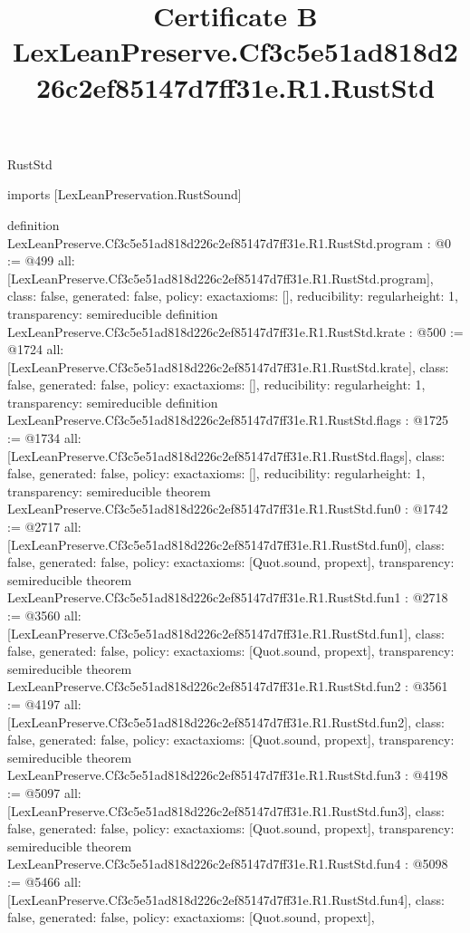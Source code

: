 \begin{lexlean}{RustStd}
\title{Certificate B LexLeanPreserve.Cf3c5e51ad818d226c2ef85147d7ff31e.R1.RustStd}
\begin{coremodule}
imports [LexLeanPreservation.RustSound]

definition LexLeanPreserve.Cf3c5e51ad818d226c2ef85147d7ff31e.R1.RustStd.program : @0 := @499 {
  all: [LexLeanPreserve.Cf3c5e51ad818d226c2ef85147d7ff31e.R1.RustStd.program],
  class: false,
  generated: false,
  policy: exact{axioms: []},
  reducibility: regular{height: 1},
  transparency: semireducible
}
definition LexLeanPreserve.Cf3c5e51ad818d226c2ef85147d7ff31e.R1.RustStd.krate : @500 := @1724 {
  all: [LexLeanPreserve.Cf3c5e51ad818d226c2ef85147d7ff31e.R1.RustStd.krate],
  class: false,
  generated: false,
  policy: exact{axioms: []},
  reducibility: regular{height: 1},
  transparency: semireducible
}
definition LexLeanPreserve.Cf3c5e51ad818d226c2ef85147d7ff31e.R1.RustStd.flags : @1725 := @1734 {
  all: [LexLeanPreserve.Cf3c5e51ad818d226c2ef85147d7ff31e.R1.RustStd.flags],
  class: false,
  generated: false,
  policy: exact{axioms: []},
  reducibility: regular{height: 1},
  transparency: semireducible
}
theorem LexLeanPreserve.Cf3c5e51ad818d226c2ef85147d7ff31e.R1.RustStd.fun0 : @1742 := @2717 {
  all: [LexLeanPreserve.Cf3c5e51ad818d226c2ef85147d7ff31e.R1.RustStd.fun0],
  class: false,
  generated: false,
  policy: exact{axioms: [Quot.sound, propext]},
  transparency: semireducible
}
theorem LexLeanPreserve.Cf3c5e51ad818d226c2ef85147d7ff31e.R1.RustStd.fun1 : @2718 := @3560 {
  all: [LexLeanPreserve.Cf3c5e51ad818d226c2ef85147d7ff31e.R1.RustStd.fun1],
  class: false,
  generated: false,
  policy: exact{axioms: [Quot.sound, propext]},
  transparency: semireducible
}
theorem LexLeanPreserve.Cf3c5e51ad818d226c2ef85147d7ff31e.R1.RustStd.fun2 : @3561 := @4197 {
  all: [LexLeanPreserve.Cf3c5e51ad818d226c2ef85147d7ff31e.R1.RustStd.fun2],
  class: false,
  generated: false,
  policy: exact{axioms: [Quot.sound, propext]},
  transparency: semireducible
}
theorem LexLeanPreserve.Cf3c5e51ad818d226c2ef85147d7ff31e.R1.RustStd.fun3 : @4198 := @5097 {
  all: [LexLeanPreserve.Cf3c5e51ad818d226c2ef85147d7ff31e.R1.RustStd.fun3],
  class: false,
  generated: false,
  policy: exact{axioms: [Quot.sound, propext]},
  transparency: semireducible
}
theorem LexLeanPreserve.Cf3c5e51ad818d226c2ef85147d7ff31e.R1.RustStd.fun4 : @5098 := @5466 {
  all: [LexLeanPreserve.Cf3c5e51ad818d226c2ef85147d7ff31e.R1.RustStd.fun4],
  class: false,
  generated: false,
  policy: exact{axioms: [Quot.sound, propext]},
}
\end{coremodule}
\end{lexlean}

